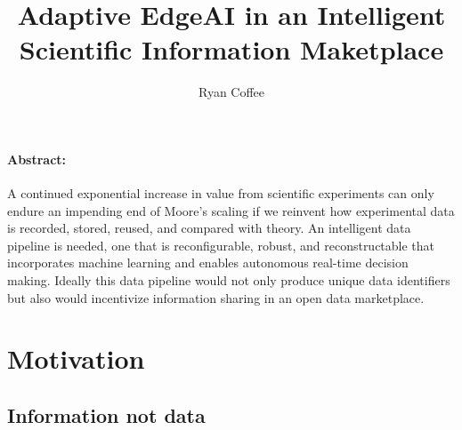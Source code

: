 \documentclass{article}
\title{Adaptive EdgeAI in an Intelligent Scientific Information Maketplace}
\author{Ryan Coffee}
\begin{document}
\maketitle

\paragraph{Abstract:} %
A continued exponential increase in value from scientific experiments can only endure an impending end of Moore's scaling if we reinvent how experimental data is recorded, stored, reused, and compared with theory.
An intelligent data pipeline is needed, one that is reconfigurable, robust, and reconstructable that incorporates machine learning and enables autonomous real-time decision making.
Ideally this data pipeline would not only produce unique data identifiers but also would incentivize information sharing in an open data marketplace.

\section{Motivation}

\subsection{Information not data}
\end{document}

